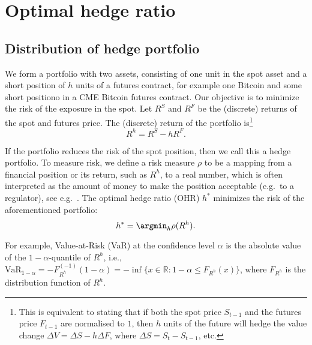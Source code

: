 \section{Optimal hedge ratio}\label{sec:optimal-hedge-ratio}

\subsection{Distribution of hedge portfolio}\label{subsec:DHP}
We form a portfolio with two assets, consisting of one unit in the
spot asset and a short position of $h$ units of a futures contract,
for example one Bitcoin and some short positiono in a CME Bitcoin
futures contract. 
Our objective is to minimize the risk of the exposure in the spot. 
Let $R^S$ and $R^F$ be the (discrete) returns of the spot and
futures price. The (discrete) return of the portfolio is\footnote{%
This is equivalent to stating that if both the spot price $S_{t-1}$
and the futures price $F_{t-1}$ are 
normalised to $1$, then $h$ units of the future will hedge the value
change $\Delta V = \Delta S - h \Delta F$, where $\Delta S =
S_t-S_{t-1}$, etc.
  }
\begin{equation*}
R^h = R^S -h R^F.
\end{equation*}
\natp{\em [We need to discuss the footnote. Generally, the portfolio
  return is $R_p = \sum_{i=1}^n w_i R_i$. With the futures contract,
  the notional investment in the futures is zero, so the portfolio
  return is $(S_0 (1+R^S) -h F_0 R^F)/S_0-1 = R^S-h R^F$, if
  $S_0=F_0$.]} 

If the portfolio reduces the risk of the spot position, then
we call this a hedge portfolio.
To measure risk, we define a risk measure $\rho$ to be a mapping from
a financial position or its return, such as $R^h$, to a real number, which is often
interpreted as the amount of money to make the position acceptable
(e.g.\ to a regulator), see e.g.\ \citep{Foellmer2002}. 
The optimal hedge ratio (OHR) $h^*$ 
minimizes the risk of the aforementioned portfolio:
\begin{equation*}
h^* = \argmin_h \rho(R^h).
\end{equation*}

For example, Value-at-Risk (VaR) at the confidence level $\alpha$ is
the absolute value of the $1-\alpha$-quantile of $R^h$, i.e., $\text{VaR}_{1-\alpha} =
-F_{R^h}^{(-1)}(1-\alpha) = -\inf\{x \in \mathbb{R}: 1-\alpha \leq
F_{R^h}(x) \}$, where $F_{R^h}$ is the distribution function of
$R^h$. \medskip

